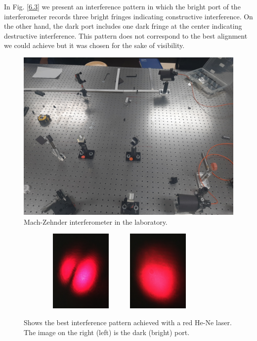 \documentclass[12pt]{book}
\begin{document}
In Fig. \ref{6.3} we present an interference pattern in which the bright port of the interferometer records three bright fringes indicating constructive interference. On the other hand, the dark port includes one dark fringe at the center indicating destructive interference. This pattern does not correspond to the best alignment we could achieve but it was chosen for the sake of visibility.
\pagebreak

\begin{figure}[t!]
\centering
\includegraphics[scale=0.08]{images/666.jpg}
\caption{Mach-Zehnder interferometer in the laboratory.}
\label{666}
\end{figure}

\begin{figure}[t!]

\begin{subfigure}[b]{\linewidth}
\centering
\includegraphics[width=4cm,height=4cm]{images/Fig62dark.jpg}
\includegraphics[width=4cm,height=4cm]{images/Fig62bright.jpg}

\end{subfigure}

\caption{Shows the best interference pattern achieved with a red He-Ne laser. The image on the right (left) is the dark (bright) port.}
\label{best}
\end{figure}
\end{document}
